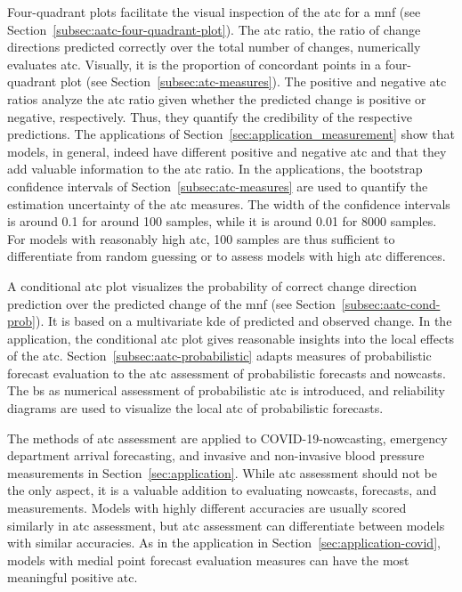 \documentclass[pdflatex]{sn-jnl}
\theoremstyle{plain}%
\theoremstyle{definition}
\begin{document}
Four-quadrant plots facilitate the visual inspection of the \ac{atc} for a \ac{mnf} (see Section~\ref{subsec:aatc-four-quadrant-plot}).
The \ac{atc} ratio, the ratio of change directions predicted correctly over the total number of changes, numerically evaluates \ac{atc}.
Visually, it is the proportion of concordant points in a four-quadrant plot (see Section~\ref{subsec:atc-measures}).
The positive and negative \ac{atc} ratios analyze the \ac{atc} ratio given whether the predicted change is positive or negative, respectively.
Thus, they quantify the credibility of the respective predictions.
The applications of Section~\ref{sec:application_measurement} show that models, in general, indeed have different positive and negative \ac{atc} and that they add valuable information to the \ac{atc} ratio.
In the applications, the bootstrap confidence intervals of Section~\ref{subsec:atc-measures} are used to quantify the estimation uncertainty of the \ac{atc} measures.
The width of the confidence intervals is around 0.1 for around 100 samples, while it is around 0.01 for 8000 samples.
For models with reasonably high \ac{atc}, 100 samples are thus sufficient to differentiate from random guessing or to assess models with high \ac{atc} differences.

A conditional \ac{atc} plot visualizes the probability of correct change direction prediction over the predicted change of the \ac{mnf} (see Section~\ref{subsec:aatc-cond-prob}).
It is based on a multivariate \acf{kde} of predicted and observed change.
In the application, the conditional \ac{atc} plot gives reasonable insights into the local effects of the \ac{atc}.
Section~\ref{subsec:aatc-probabilistic} adapts measures of probabilistic forecast evaluation to the \ac{atc} assessment of probabilistic forecasts and nowcasts.
The \acf{bs} as numerical assessment of probabilistic \ac{atc} is introduced, and reliability diagrams are used to visualize the local \ac{atc} of probabilistic forecasts.

The methods of \ac{atc} assessment are applied to COVID-19-nowcasting, emergency department arrival forecasting, and invasive and non-invasive blood pressure measurements in Section~\ref{sec:application}.
While \ac{atc} assessment should not be the only aspect, it is a valuable addition to evaluating nowcasts, forecasts, and measurements.
Models with highly different accuracies are usually scored similarly in \ac{atc} assessment, but \ac{atc} assessment can differentiate between models with similar accuracies.
As in the application in Section~\ref{sec:application-covid}, models with medial point forecast evaluation measures can have the most meaningful positive \ac{atc}.
\end{document}
